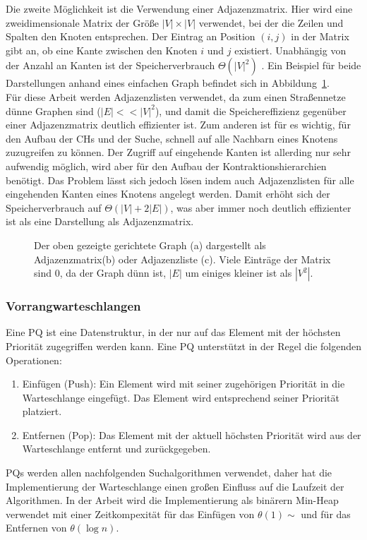 Die zweite Möglichkeit ist die Verwendung einer Adjazenzmatrix. Hier wird eine zweidimensionale
Matrix der Größe $|V| \times |V|$ verwendet, bei der die Zeilen und Spalten den Knoten entsprechen.
Der Eintrag an Position $(i,j)$ in der Matrix gibt an, ob eine Kante zwischen den Knoten $i$ und $j$
existiert. Unabhängig von der Anzahl an Kanten ist der Speicherverbrauch $\Theta(|V|^2)$
\cite{intro.algo}. Ein Beispiel für beide Darstellungen anhand eines einfachen Graph befindet sich
in Abbildung~\ref{fig:graph_ex1}.\\

Für diese Arbeit werden Adjazenzlisten verwendet, da zum einen Straßennetze dünne Graphen sind ($|E|
    << |V|^2$), und damit die Speichereffizienz gegenüber einer Adjazenzmatrix deutlich effizienter
ist. Zum anderen ist für es wichtig, für den Aufbau der \ac{CHs} und der Suche, schnell auf alle
Nachbarn eines Knotens zuzugreifen zu können. Der Zugriff auf
eingehende Kanten ist allerding nur sehr aufwendig  möglich, wird  aber für den Aufbau der
Kontraktionshierarchien benötigt. Das Problem lässt sich jedoch lösen indem auch
Adjazenzlisten für alle eingehenden Kanten eines Knotens angelegt werden. Damit erhöht sich der
Speicherverbrauch auf $\Theta(|V| + 2|E|)$, was aber immer noch deutlich effizienter ist als
eine Darstellung als Adjazenzmatrix.%

\begin{figure}[H]
    \centering
    
    \caption[Graph als Adjazenzmatrix und Adjazenzliste]{Der oben gezeigte gerichtete Graph (a) dargestellt als Adjazenzmatrix(b) oder
        Adjazenzliste (c). Viele Einträge der Matrix sind 0, da der Graph dünn ist, \dH $|E|$
        um einiges kleiner ist als $|V^2|$.}
    \label{fig:graph_ex1}
\end{figure}

\subsubsection{Vorrangwarteschlangen}
Eine \ac{PQ} ist eine Datenstruktur, in der nur auf das Element mit der höchsten Priorität
zugegriffen werden kann. Eine \ac{PQ} unterstützt in der Regel die folgenden Operationen:
\begin{enumerate}
    \item Einfügen (Push): Ein Element wird mit seiner zugehörigen Priorität in die Warteschlange
          eingefügt. Das Element wird entsprechend seiner Priorität platziert.
    \item Entfernen (Pop): Das Element mit der aktuell höchsten Priorität wird aus der Warteschlange
          entfernt und zurückgegeben.
\end{enumerate}
\ac{PQ}s werden allen nachfolgenden Suchalgorithmen verwendet, daher hat die Implementierung der
Warteschlange einen großen Einfluss auf die Laufzeit der Algorithmen. In der Arbeit wird die
Implementierung als binärern Min-Heap verwendet mit einer Zeitkompexität für das Einfügen von
$\theta(1)\sim$ und für das Entfernen von $\theta(\log n)$.

